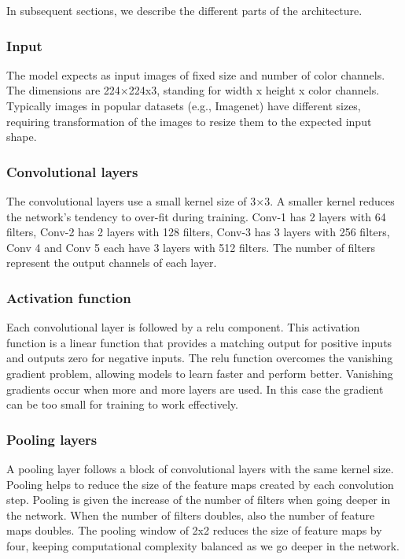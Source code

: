 In subsequent sections, we describe the different parts of the architecture.
\subsubsection{Input}
The model expects as input images of fixed size and number of color channels. The dimensions are 224×224x3, standing for width x height x color channels. Typically images in popular datasets (e.g., Imagenet) have different sizes, requiring transformation of the images to resize them to the expected input shape.

\subsubsection{Convolutional layers}
The convolutional layers use a small kernel size of 3×3. A smaller kernel reduces the network’s tendency to over-fit during training. Conv-1 has 2 layers with 64 filters, Conv-2 has 2 layers with 128 filters, Conv-3 has 3 layers with 256 filters, Conv 4 and Conv 5 each have 3 layers with 512 filters. The number of filters represent the output channels of each layer.

\subsubsection{Activation function}
Each convolutional layer is followed by a \acrfull{relu} component. This activation function is a linear function that provides a matching output for positive inputs and outputs zero for negative inputs. The \acrshort{relu} function overcomes the vanishing gradient problem, allowing models to learn faster and perform better. Vanishing gradients occur when more and more layers are used. In this case the gradient can be too small for training to work effectively.

\subsubsection{Pooling layers}
A pooling layer follows a block of convolutional layers with the same kernel size. Pooling helps to reduce the size of the feature maps created by each convolution step. Pooling is given the increase  of the number of filters when going deeper in the network. When the number of filters doubles, also the number of feature maps doubles. The pooling window of 2x2 reduces the size of feature maps by four, keeping computational complexity balanced as we go deeper in the network.

